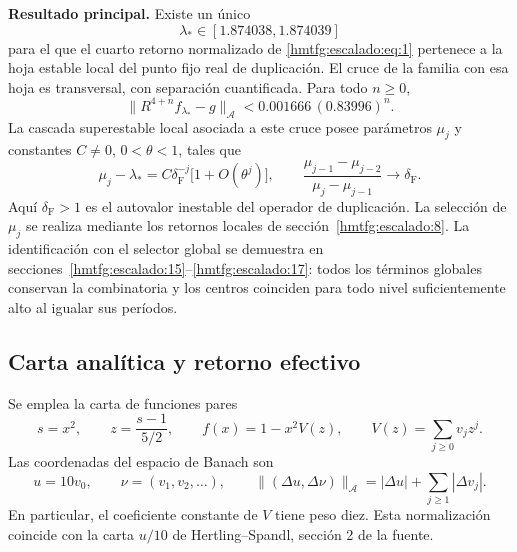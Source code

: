 \textbf{Resultado principal.} Existe un único
\begin{equation}
\lambda_*\in[1.874038,1.874039]
\label{hmtfg:escalado:eq:2}
\end{equation}
para el que el cuarto retorno normalizado de \eqref{hmtfg:escalado:eq:1} pertenece a la hoja estable local del punto fijo real de duplicación. El cruce de la familia con esa hoja es transversal, con separación cuantificada. Para todo \(n\ge0\),
\begin{equation}
\boxed{\|R^{4+n}f_{\lambda_*}-g\|_{\mathcal A}
<0.001666\,(0.83996)^n.}
\label{hmtfg:escalado:eq:3}
\end{equation}
La cascada superestable local asociada a este cruce posee parámetros \(\mu_j\) y constantes \(C\ne0\), \(0<\theta<1\), tales que
\begin{equation}
\mu_j-\lambda_*=C\delta_{\mathrm F}^{-j}\bigl[1+O(\theta^j)\bigr],
\qquad
\frac{\mu_{j-1}-\mu_{j-2}}{\mu_j-\mu_{j-1}}\longrightarrow\delta_{\mathrm F}.
\label{hmtfg:escalado:eq:4}
\end{equation}
Aquí \(\delta_{\mathrm F}>1\) es el autovalor inestable del operador de duplicación. La selección de \(\mu_j\) se realiza mediante los retornos locales de sección~\ref{hmtfg:escalado:8}. La identificación con el selector global se demuestra en secciones~\ref{hmtfg:escalado:15}--\ref{hmtfg:escalado:17}: todos los términos globales conservan la combinatoria y los centros coinciden para todo nivel suficientemente alto al igualar sus períodos.


\subsection{Carta analítica y retorno efectivo}
\label{hmtfg:escalado:2}

Se emplea la carta de funciones pares
\[
s=x^2,\qquad z=\frac{s-1}{5/2},\qquad
f(x)=1-x^2V(z),\qquad V(z)=\sum_{j\ge0}v_jz^j.
\]
Las coordenadas del espacio de Banach son
\begin{equation}
u=10v_0,\qquad \nu=(v_1,v_2,\ldots),\qquad
\|(\Delta u,\Delta\nu)\|_{\mathcal A}
=|\Delta u|+\sum_{j\ge1}|\Delta v_j|.
\label{hmtfg:escalado:eq:5}
\end{equation}
En particular, el coeficiente constante de \(V\) tiene peso diez. Esta normalización coincide con la carta \(u/10\) de Hertling–Spandl, sección 2 de la fuente.


